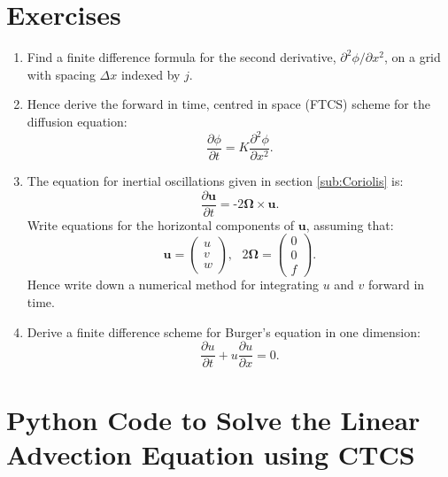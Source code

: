 \section{Exercises}
\begin{enumerate}
\item Find a finite difference formula for the second derivative, $\partial^{2}\phi/\partial x^{2}$,
on a grid with spacing $\Delta x$ indexed by $j$.
\item Hence derive the forward in time, centred in space (FTCS) scheme for
the diffusion equation:
\[
\frac{\partial\phi}{\partial t}=K\frac{\partial^{2}\phi}{\partial x^{2}}.
\]

\item The equation for inertial oscillations given in section \ref{sub:Coriolis}
is:
\[
\frac{\partial\mathbf{u}}{\partial t}=\text{-}2\bm{\Omega}\times\mathbf{u}.
\]
Write equations for the horizontal components of $\mathbf{u}$, assuming
that:
\[
\mathbf{u}=\left(\begin{array}{c}
u\\
v\\
w
\end{array}\right),\ \ \ 2\bm{\Omega}=\left(\begin{array}{c}
0\\
0\\
f
\end{array}\right).
\]
Hence write down a numerical method for integrating $u$ and $v$
forward in time.
\item Derive a finite difference scheme for Burger's equation in one dimension:
\[
\frac{\partial u}{\partial t}+u\frac{\partial u}{\partial x}=0.
\]

\end{enumerate}

\clearpage{}


\section{Python Code to Solve the Linear Advection Equation using CTCS\label{sec:CTCScode}}


